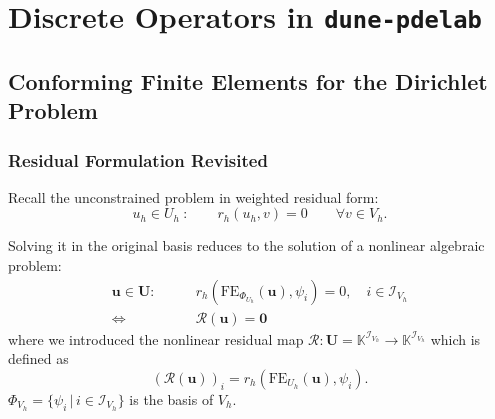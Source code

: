 \section{Discrete Operators in  \texttt{dune-pdelab}}

\subsection{Conforming Finite Elements for the Dirichlet Problem}

\begin{frame}
\frametitle<presentation>{Residual Formulation Revisited}
Recall the unconstrained problem in weighted residual form:
\begin{equation*}
u_h\in U_h\ : \qquad r_h(u_h,v) = 0 \qquad \forall
v\in V_h .
\end{equation*}

Solving it in the original basis
reduces to the solution of a nonlinear algebraic problem:
\begin{equation*}
\begin{split}
\mathbf{u}\in\mathbf{U} : \qquad
& r_h\left(\text{FE}_{\Phi_{U_h}}(\mathbf{u}),\psi_i\right) = 0, \quad
i\in\mathcal{I}_{V_h} \\
\Leftrightarrow \  & \mathcal{R}(\mathbf{u}) = \mathbf{0}
\end{split}
\end{equation*}
where we introduced the nonlinear residual map $\mathcal{R} :
\mathbf{U} = \mathbb{K}^{\mathcal{I}_{V_h}} \to \mathbb{K}^{\mathcal{I}_{V_h}}$ which is defined as
\begin{equation*}
\left(
\mathcal{R}(\mathbf{u})\right)_i =
r_h(\text{FE}_{U_h}(\mathbf{u}),\psi_i).
\end{equation*}
$\Phi_{V_h} = \{\psi_i\,|\, i\in\mathcal{I}_{V_h}\}$ is the basis of $V_h$.
\end{frame}


